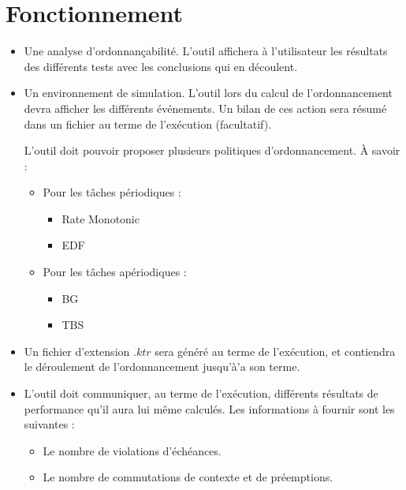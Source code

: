 \section{Fonctionnement}
\begin{itemize}
\item
Une analyse d'ordonnançabilité. L'outil affichera à l'utilisateur les résultats des différents tests avec les conclusions qui en découlent.
\item
Un environnement de simulation. L'outil lors du calcul de l'ordonnancement devra afficher les différents événements. Un bilan de ces action sera résumé dans un fichier au terme de l'exécution (facultatif).

L'outil doit pouvoir proposer plusieurs politiques d'ordonnancement. \`A savoir : 
\begin{itemize}
\item
Pour les tâches périodiques :

\begin{itemize}
\item
Rate Monotonic
\item
EDF
\end{itemize}

\item
Pour les tâches apériodiques : 
\begin{itemize}
\item
BG
\item
TBS
\end{itemize}

\end{itemize} 
\item
Un fichier d'extension $.ktr$ sera généré au terme de l'exécution, et contiendra le déroulement de l'ordonnancement jusqu'à'a son terme.
\item
L'outil doit communiquer, au terme de l'exécution, différents résultats de performance qu'il aura lui même calculés. Les informations à fournir sont les suivantes : 
\begin{itemize}
\item
Le nombre de violations d'échéances.
\item
Le nombre de commutations de contexte et de préemptions.
\end{itemize}
\end{itemize}

